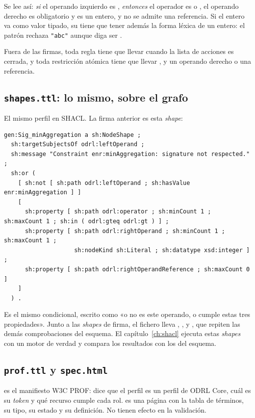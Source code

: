 Se lee así: \emph{si} el operando izquierdo es , \emph{entonces} el operador es  o
, el operando derecho es obligatorio y es un entero, y no se admite una referencia. Si el entero va
como valor tipado, su  tiene que tener además la forma léxica de un entero: el patrón rechaza
\texttt{"abc"} aunque diga ser .

Fuera de las firmas, toda regla tiene que llevar  cuando la lista de acciones es cerrada, y toda
restricción atómica tiene que llevar ,  y un operando derecho o una referencia.

\subsection{\texttt{shapes.ttl}: lo mismo, sobre el grafo}

El mismo perfil en SHACL. La firma anterior es esta \emph{shape}:

\begin{lstlisting}[style=ttl]
gen:Sig_minAggregation a sh:NodeShape ;
  sh:targetSubjectsOf odrl:leftOperand ;
  sh:message "Constraint enr:minAggregation: signature not respected." ;
  sh:or (
    [ sh:not [ sh:path odrl:leftOperand ; sh:hasValue enr:minAggregation ] ]
    [
      sh:property [ sh:path odrl:operator ; sh:minCount 1 ; sh:maxCount 1 ; sh:in ( odrl:gteq odrl:gt ) ] ;
      sh:property [ sh:path odrl:rightOperand ; sh:minCount 1 ; sh:maxCount 1 ;
                    sh:nodeKind sh:Literal ; sh:datatype xsd:integer ] ;
      sh:property [ sh:path odrl:rightOperandReference ; sh:maxCount 0 ]
    ]
  ) .
\end{lstlisting}

Es el mismo condicional, escrito como «o no es este operando, o cumple estas tres propiedades». Junto a las
\emph{shapes} de firma, el fichero lleva , ,
 y , que repiten las demás comprobaciones del esquema. El
capítulo~\ref{ch:shacl} ejecuta estas \emph{shapes} con un motor de verdad y compara los resultados con los del
esquema.

\subsection{\texttt{prof.ttl} y \texttt{spec.html}}

 es el manifiesto W3C PROF: dice que el perfil es un perfil de ODRL Core, cuál es su \emph{token}
y qué recurso cumple cada rol.  es una página con la tabla de términos, su tipo, su estado y su
definición. No tienen efecto en la validación.

